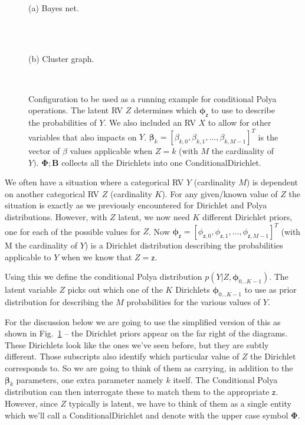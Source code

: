 \documentclass[oneside,english]{scrbook}
\begin{document}
\begin{figure}[!b]
  \begin{centering}
    \parbox{0.95\textwidth}{ \centering
      \\
      (a) Bayes net.}\\[5mm]
  \end{centering}
  \begin{centering}
    \parbox{0.95\textwidth}{ \centering
      \\
      (b) Cluster graph.}\\[5mm]
  \end{centering}
  \caption{Configuration to be used as a running example for
    conditional Polya operations. The latent RV $Z$ determines which
    $\bm{\phi}_{\mathsf{z}}$ to use to describe the probabilities of
    $Y$. We also included an RV $X$ to allow for other variables that
    also impacts on $Y$. $\bm{\beta}_k = [\beta_{k,0},\beta_{k,1},
      \ldots, \beta_{k,M-1}]^T$ is the vector of $\beta$ values
    applicable when $Z=k$ (with $M$ the cardinality of
    $Y)$. $\bm{\Phi};\bm{B}$ collects all the Dirichlets into one
    ConditionalDirichlet.\label{fig:condpolya} }
\end{figure}

We often have a situation where a categorical RV $Y$ (cardinality $M$)
is dependent on another categorical RV $Z$ (cardinality $K$). For any
given/known value of $Z$ the situation is exactly as we previously
encountered for Dirichlet and Polya distributions. However, with $Z$
latent, we now need $K$ different Dirichlet priors, one for each of
the possible values for $Z$. Now $\bm{\phi}_{\mathsf{z}} =
[\phi_{\mathsf{z},0},\phi_{\mathsf{z},1},\ldots,\phi_{\mathsf{z},M-1}]^T$
(with M the cardinality of $Y$) is a Dirichlet distribution describing
the probabilities applicable to $Y$ when we know that $Z=\mathsf{z}$.

Using this we define the conditional Polya distribution
$p(Y|Z,\bm{\phi}_{0\ldots K-1})$. The latent variable $Z$ picks out
which one of the $K$ Dirichlets $\bm{\phi}_{0\ldots K-1}$ to use as
prior distribution for describing the $M$ probabilities for the
various values of $Y$.

For the discussion below we are going to use the simplified version of
this as shown in Fig.~\ref{fig:condpolya} -- the Dirichlet priors
appear on the far right of the diagrams. These Dirichlets look like
the ones we've seen before, but they are subtly different. Those
subscripts also identify which particular value of $Z$ the Dirichlet
corresponds to. So we are going to think of them as carrying, in
addition to the $\bm{\beta}_k$ parameters, one extra parameter namely
$k$ itself. The Conditional Polya distribution can then interrogate
these to match them to the appropriate $\mathsf{z}$. However, since
$Z$ typically is latent, we have to think of them as a single entity
which we'll call a ConditionalDirichlet and denote with the upper
case symbol $\bm{\Phi}$.
\end{document}

